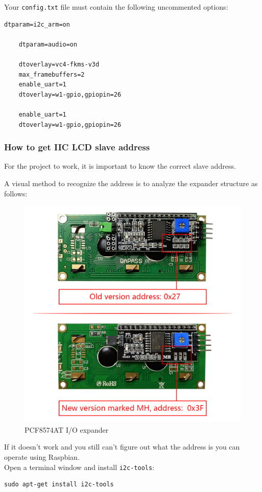 \documentclass[a4paper, 12pt]{article}
\begin{document}
Your \texttt{config.txt} file must contain the following uncommented options:

\begin{Verbatim}[breaklines=true, breakanywhere=true]
    dtparam=i2c_arm=on

    dtparam=audio=on

    dtoverlay=vc4-fkms-v3d
    max_framebuffers=2
    enable_uart=1
    dtoverlay=w1-gpio,gpiopin=26

    enable_uart=1
    dtoverlay=w1-gpio,gpiopin=26
\end{Verbatim}

\subsubsection{How to get IIC LCD slave address}

For the project to work, it is important to know the correct slave address.

A visual method to recognize the address is to analyze the expander structure as follows\cite{i2cLcd}:
\begin{figure}[h]
    \includegraphics[width=13.5cm]{i2c_lcd}
    \centering
    \caption{PCF8574AT I/O expander}
\end{figure}

If it doesn't work and you still can't figure out what the address is you can operate using Raspbian. \\
Open a terminal window and install \texttt{i2c-tools}:
\begin{Verbatim}[breaklines=true, breakanywhere=true]
    sudo apt-get install i2c-tools
\end{Verbatim}
\end{document}
